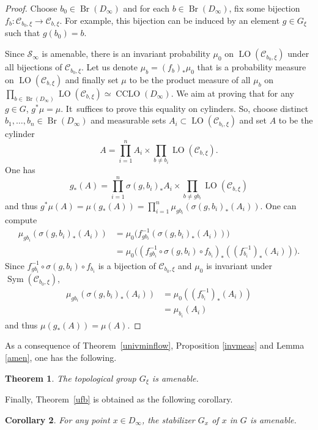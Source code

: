 \documentclass[JEP,XML,SOM,Unicode,NoFloatCountersInSection]{cedram}
\let\mathcal\mathscr
\theoremstyle{plain}
\newtheorem{thm}{Theorem}[section]
\newtheorem{cor}[thm]{Corollary}
\theoremstyle{definition}
\newcommand{\cC}{\mathcal{C}}
\newcommand{\cS}{\mathcal{S}}
\newcommand{\sinf}{\cS_\infty}
\DeclareMathOperator{\Sym}{Sym}
\DeclareMathOperator{\Br}{Br}
\DeclareMathOperator{\CLO}{CCLO}
\DeclareMathOperator{\LO}{LO}
\begin{document}
\begin{proof}Choose $b_0\in\Br(D_\infty)$ and for each $b\in\Br(D_\infty)$, fix some bijection $f_b\colon \cC_{b_0,\xi}\to\cC_{b,\xi}$. For example, this bijection can be induced by an element $g\in G_\xi$ such that $g(b_0)=b$.

Since $\sinf$ is amenable, there is an invariant probability $\mu_0$ on $\LO\left(\cC_{b_0,\xi}\right)$ under all bijections of $\cC_{b_0,\xi}$. Let us denote $\mu_b=(f_b)_*\mu_0$ that is a probability measure on $\LO\left(\cC_{b,\xi}\right)$ and finally set $\mu$ to be the product measure of all $\mu_b$ on $\prod_{b\in\Br(D_\infty)}\LO(\cC_{b,\xi})\simeq \CLO(D_\infty)$. We aim at proving that for any $g\in G$, $g^*\mu=\mu$. It~suffices to prove this equality on cylinders. So, choose distinct $b_1,\dots,b_n\in \Br(D_\infty)$ and measurable sets $A_i\subset \LO(\cC_{b_i,\xi})$ and set $A$ to be the cylinder
\[
A=\prod_{i=1}^n A_i\times \prod_{b\neq b_i}\LO(\cC_{b,\xi}).
\]
One has
\[
g_*(A)=\prod_{i=1}^n \sigma(g,b_i)_*A_i\times\prod_{b\neq gb_i}\LO\left(\cC_{b,\xi}\right)
\]
and thus $g^*\mu(A)=\mu(g_*(A))=\prod_{i=1}^n\mu_{gb_i}(\sigma(g,b_i)_*(A_i))$. One can compute
\begin{align*}
\mu_{gb_i}\left(\sigma(g,b_i)_*(A_i)\right)&=\mu_0\bigl(f_{gb_i}^{-1}\left(\sigma(g,b_i)_*(A_i)\right)\bigr)\\
&=\mu_0\bigl((f_{gb_i}^{-1}\circ\sigma(g,b_i)\circ f_{b_i})_*((f_{b_i}^{-1})_*(A_i))\bigr).\end{align*}
Since $f_{gb_i}^{-1}\circ\sigma(g,b_i)\circ f_{b_i}$ is a bijection of $\cC_{b_0,\xi}$ and $\mu_0$ is invariant under $\Sym\left(\cC_{b_0,\xi}\right)$,
\begin{align*}
\mu_{gb_i}\left(\sigma(g,b_i)_*(A_i)\right)&=\mu_0\left((f_{b_i}^{-1})_*(A_i)\right)\\
&=\mu_{b_i}(A_i)
\end{align*}
and thus $\mu\left(g_*(A)\right)=\mu(A)$.
\end{proof}
As a consequence of Theorem~\ref{univminflow}, Proposition \ref{invmeas} and Lemma \ref{amen}, one has the following.
\begin{thm}The topological group $G_\xi$ is amenable.
\end{thm}

Finally, Theorem~\ref{ufb} is obtained as the following corollary.

\begin{cor}For any point $x\in D_\infty$, the stabilizer $G_x$ of $x$ in $G$ is amenable.
\end{cor}
\end{document}
